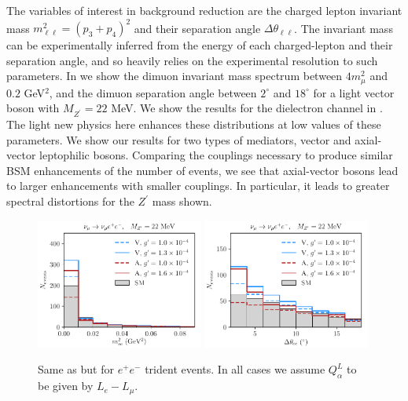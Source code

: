 The variables of interest in background reduction are the charged lepton invariant mass $m^2_{\ell \ell} = (p_3+p_4)^2$ and their separation angle $\Delta \theta_{\ell\ell}$. The invariant mass can be experimentally inferred from the energy of each charged-lepton and their separation angle, and so heavily relies on the experimental resolution to such parameters. In  we show the dimuon invariant mass spectrum between $4 m_{\mu}^2$ and $0.2$ GeV$^2$, and the dimuon separation angle between $2^\circ$ and $18^\circ$ for a light vector boson with $M_{Z^\prime} = 22$ MeV. We show the results for the dielectron channel in . The light new physics here enhances these distributions at low values of these parameters. We show our results for two types of mediators, vector and axial-vector leptophilic bosons. Comparing the couplings necessary to produce similar BSM enhancements of the number of events, we see that axial-vector bosons lead to larger enhancements with smaller couplings. In particular, it leads to greater spectral distortions for the $Z^\prime$ mass shown.
%
\begin{figure}[t]
%
\centering
%
\includegraphics[width=0.49\textwidth]{BSM_invmass_ee.pdf}
\includegraphics[width=0.49\textwidth]{BSM_sepangle_ee.pdf}
%
\caption[Kinematical distributions for dielectron tridents.]{Same as  but for $e^+e^-$ trident events. In all cases we assume $Q^L_{\alpha}$ to be given by $L_e - L_\mu$. \label{fig:ee_spectra}}
%
\end{figure}
%


